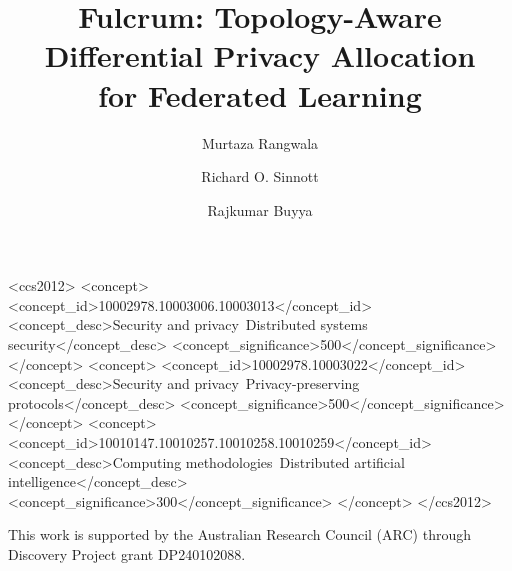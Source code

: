 \documentclass[manuscript,screen]{acmart}
\begin{document}
\title{Fulcrum: Topology-Aware Differential Privacy Allocation\\for Federated Learning}

\author{Murtaza Rangwala}

\author{Richard O. Sinnott}

\author{Rajkumar Buyya}



\begin{CCSXML}
<ccs2012>
   <concept>
       <concept_id>10002978.10003006.10003013</concept_id>
       <concept_desc>Security and privacy~Distributed systems security</concept_desc>
       <concept_significance>500</concept_significance>
   </concept>
   <concept>
       <concept_id>10002978.10003022</concept_id>
       <concept_desc>Security and privacy~Privacy-preserving protocols</concept_desc>
       <concept_significance>500</concept_significance>
   </concept>
   <concept>
       <concept_id>10010147.10010257.10010258.10010259</concept_id>
       <concept_desc>Computing methodologies~Distributed artificial intelligence</concept_desc>
       <concept_significance>300</concept_significance>
   </concept>
</ccs2012>
\end{CCSXML}



\maketitle










\begin{acks}
This work is supported by the Australian Research Council (ARC) through
Discovery Project grant DP240102088.
\end{acks}




\appendix

\end{document}
